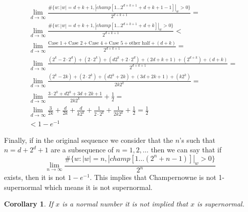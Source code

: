 \documentclass[11pt,a4paper]{tesis}
\newtheorem{corollary}{Corollary}[]
\newcommand{\note}[1]{\textbf{\color{red}{#1}}}
\begin{document}
\begin{align*}
&\lim_{d\to\infty} \frac{\#\{w : |w| = d+k+1, |champ[1 \dots 2^{d+k+1}+d+k+1-1]|_w > 0 \}}{2^{d+k+1}} =\\
&\lim_{d\to\infty} \frac{\#\{w : |w| = d+k+1, |champ[1 \dots 2^{d+k+1}+d+k]|_w > 0 \}}{2^{d+k+1}} <\\
&\lim_{d\to\infty} \frac{ \textrm{Case 1} + \textrm{Case 2}+ \textrm{Case 4} + \textrm{Case 5} + \textrm{other half} + (d + k) }{2^{d+k+1}} =\\
&\lim_{d\to\infty} \frac{(2^k - 2\cdot 2^d) + (2 \cdot 2^k)+ (d2^k + 2 \cdot 2^d) + (2d+k+1) + (2^{d+k}) + (d + k) }{2^{d+k+1}} =\\
&\lim_{d\to\infty} \frac{(2^k - 2k) + (2 \cdot 2^k)+ (d2^k + 2k) + (3d+2k+1) + (k2^{k})}{2k2^{k}} =\\
&\lim_{d\to\infty} \frac{3\cdot2^k + d2^k  + 3d+2k+1}{2k2^{k}} + \frac{1}{2} =\\
&\lim_{d\to\infty} \frac{3}{2k} + \frac{d}{2k} + \frac{d}{k2^{k}} + \frac{1}{2\cdot2^{k}} + \frac{1}{2k2^{k}} + \frac{1}{2} = \frac{1}{2} \\
&< 1 - e^{-1}
\end{align*}

Finally, if in the original sequence we consider that the $n$'s such that $n = d + 2^d + 1$ are a subsequence of $n=1,2,\dots$ then we can say that if
$$\lim_{n\to\infty} \frac{\#\{w: |w| = n  , |champ[1...(2^n+n-1)]|_w > 0\}}{2^n}$$
exists, then it is not $1 - e^{-1}$.
This implies that Champernowne is not 1-supernormal which means it is not supernormal.

\begin{corollary}
If $x$ is a normal number it is not implied that $x$ is supernormal.
\end{corollary}



\backmatter


\end{document}
